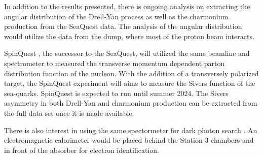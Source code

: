 \documentclass[../main.tex]{subfiles}
\begin{document}
In addition to the results presented, there is ongoing analysis on extracting 
the angular distribution of the Drell-Yan process as well as the charmonium 
production from the SeaQuest data. The analysis of the angular distribution would 
utilize the data from the dump, where most of the proton beam interacts.

SpinQuest \cite{geesaman2014}, the successor to the SeaQuest, will utilized the same beamline and 
spectrometer to measured the transverse momentum dependent parton distribution 
function of the nucleon. With the addition of a transversely polarized  
target, the SpinQuest experiment will aims to measure the Sivers function of the
sea-quarks.
SpinQuest is expected to run until summer 2024. The Sivers
asymmetry in both Drell-Yan and charmonium production can be extracted from the full
data set once it is made available.

There is also interest in using the same spectormeter for dark photon search
\cite{apyan2022}. An electromagnetic calorimeter would be placed behind the 
Station 3 chambers and in front of the absorber for electron identification.

\ifSubfilesClassLoaded{ \printbibliography[heading=bibintoc,title={References}]}{}
\end{document}
